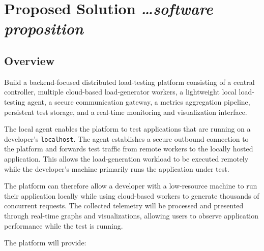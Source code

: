 \documentclass[11pt,a4paper]{article}
\newcommand{\BvrHint}[1]{%
  {\normalfont\normalsize\itshape\hfill #1}}
\begin{document}
\section{Proposed Solution%
  \BvrHint{\ldots software proposition}}

\subsection{Overview}

Build a backend-focused distributed load-testing platform consisting
of a central controller, multiple cloud-based load-generator workers,
a lightweight local load-testing agent, a secure communication
gateway, a metrics aggregation pipeline, persistent test storage,
and a real-time monitoring and visualization interface.

The local agent enables the platform to test applications that are
running on a developer's \texttt{localhost}. The agent establishes a
secure outbound connection to the platform and forwards test traffic
from remote workers to the locally hosted application. This allows
the load-generation workload to be executed remotely while the
developer's machine primarily runs the application under test.

The platform can therefore allow a developer with a low-resource
machine to run their application locally while using cloud-based
workers to generate thousands of concurrent requests. The collected
telemetry will be processed and presented through real-time graphs
and visualizations, allowing users to observe application performance
while the test is running.

The platform will provide:
\end{document}
